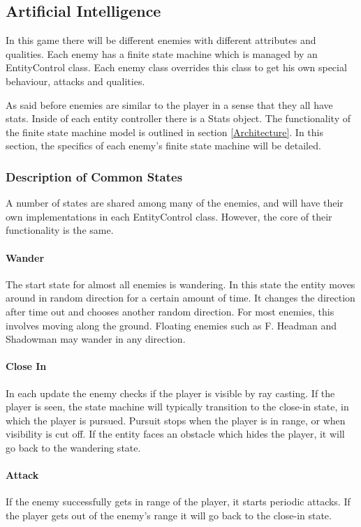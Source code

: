 \documentclass{article}
\begin{document}
\subsection{Artificial Intelligence}

In this game there will be different enemies with different attributes and qualities. Each enemy has a finite state machine which is managed by an EntityControl class. Each enemy class overrides this class to get his own special behaviour, attacks and qualities.

As said before enemies are similar to the player in a sense that they all have stats.  Inside of each entity controller there is a Stats object.   The functionality of the finite state machine model is outlined in section \ref{Architecture}.  In this section, the specifics of each enemy's finite state machine will be detailed.

\subsubsection{Description of Common States}
A number of states are shared among many of the enemies, and will have their own implementations in each EntityControl class.  However, the core of their functionality is the same.

\paragraph{Wander}
The start state for almost all enemies is wandering. In this state the entity moves around in random direction for a certain amount of time.  It changes the direction after time out and chooses another random direction.  For most enemies, this involves moving along the ground.  Floating enemies such as F. Headman and Shadowman may wander in any direction.

\paragraph{Close In}
In each update the enemy checks if the player is visible by ray casting.  If the player is seen, the state machine will typically transition to the close-in state, in which the player is pursued.  Pursuit stops when the player is in range, or when visibility is cut off.  If the entity faces an obstacle which hides the player, it will go back to the wandering state.

\paragraph{Attack}
If the enemy successfully gets in range of the player, it starts periodic attacks.  If the player gets out of the enemy’s range it will go back to the close-in state.
\end{document}
